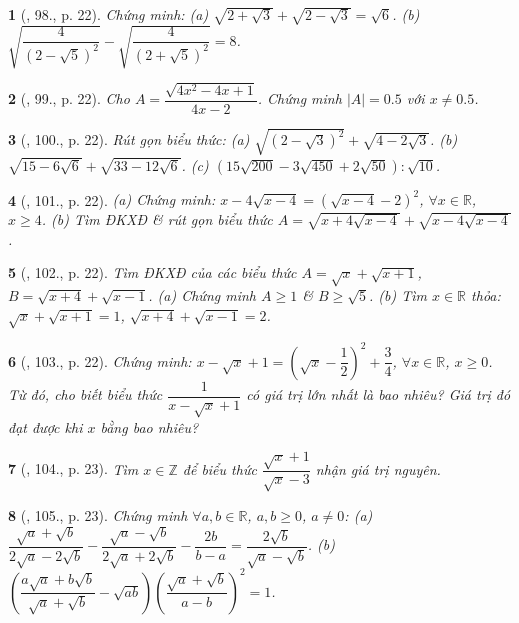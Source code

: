 \documentclass{article}
\newtheorem{baitoan}{}
\begin{document}
\begin{baitoan}[\cite{SBT_Toan_9_tap_1}, 98., p. 22]
	Chứng minh: (a) $\sqrt{2 + \sqrt{3}} + \sqrt{2 - \sqrt{3}} = \sqrt{6}$. (b) $\sqrt{\dfrac{4}{(2 - \sqrt{5})^2}} - \sqrt{\dfrac{4}{(2 + \sqrt{5})^2}} = 8$.
\end{baitoan}

\begin{baitoan}[\cite{SBT_Toan_9_tap_1}, 99., p. 22]
	Cho $A = \dfrac{\sqrt{4x^2 - 4x + 1}}{4x - 2}$. Chứng minh $|A| = 0.5$ với $x\ne0.5$.
\end{baitoan}

\begin{baitoan}[\cite{SBT_Toan_9_tap_1}, 100., p. 22]
	Rút gọn biểu thức: (a) $\sqrt{(2 - \sqrt{3})^2} + \sqrt{4 - 2\sqrt{3}}$. (b) $\sqrt{15 - 6\sqrt{6}} + \sqrt{33 - 12\sqrt{6}}$. (c) $(15\sqrt{200} - 3\sqrt{450} + 2\sqrt{50}):\sqrt{10}$.
\end{baitoan}

\begin{baitoan}[\cite{SBT_Toan_9_tap_1}, 101., p. 22]
	(a) Chứng minh: $x - 4\sqrt{x - 4} = (\sqrt{x - 4} - 2)^2$, $\forall x\in\mathbb{R}$, $x\ge4$. (b) Tìm ĐKXĐ \& rút gọn biểu thức $A = \sqrt{x + 4\sqrt{x - 4}} + \sqrt{x - 4\sqrt{x - 4}}$.
\end{baitoan}

\begin{baitoan}[\cite{SBT_Toan_9_tap_1}, 102., p. 22]
	Tìm ĐKXĐ của các biểu thức $A = \sqrt{x} + \sqrt{x + 1}$, $B = \sqrt{x + 4} + \sqrt{x - 1}$. (a) Chứng minh $A\ge1$ \& $B\ge\sqrt{5}$. (b) Tìm $x\in\mathbb{R}$ thỏa: $\sqrt{x} + \sqrt{x + 1} = 1$, $\sqrt{x + 4} + \sqrt{x - 1} = 2$.
\end{baitoan}

\begin{baitoan}[\cite{SBT_Toan_9_tap_1}, 103., p. 22]
	Chứng minh: $x - \sqrt{x} + 1 = \left(\sqrt{x} - \dfrac{1}{2}\right)^2 + \dfrac{3}{4}$, $\forall x\in\mathbb{R}$, $x\ge0$. Từ đó, cho biết biểu thức $\dfrac{1}{x - \sqrt{x} + 1}$ có giá trị lớn nhất là bao nhiêu? Giá trị đó đạt được khi $x$ bằng bao nhiêu?
\end{baitoan}

\begin{baitoan}[\cite{SBT_Toan_9_tap_1}, 104., p. 23]
	Tìm $x\in\mathbb{Z}$ để biểu thức $\dfrac{\sqrt{x} + 1}{\sqrt{x} - 3}$ nhận giá trị nguyên.
\end{baitoan}

\begin{baitoan}[\cite{SBT_Toan_9_tap_1}, 105., p. 23]
	Chứng minh $\forall a,b\in\mathbb{R}$, $a,b\ge0$, $a\ne0$: (a) $\dfrac{\sqrt{a} + \sqrt{b}}{2\sqrt{a} - 2\sqrt{b}} - \dfrac{\sqrt{a} - \sqrt{b}}{2\sqrt{a} + 2\sqrt{b}} - \dfrac{2b}{b - a} = \dfrac{2\sqrt{b}}{\sqrt{a} - \sqrt{b}}$. (b) $\left(\dfrac{a\sqrt{a} + b\sqrt{b}}{\sqrt{a} + \sqrt{b}} - \sqrt{ab}\right)\left(\dfrac{\sqrt{a} + \sqrt{b}}{a - b}\right)^2 = 1$.
\end{baitoan}
\end{document}
